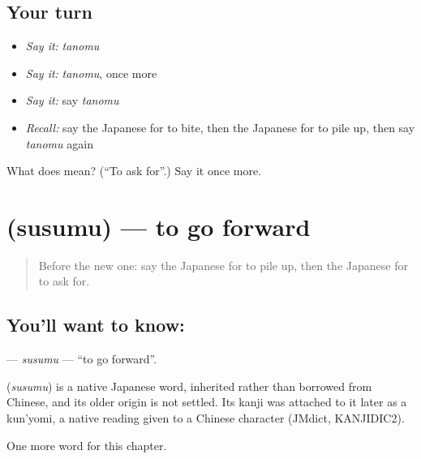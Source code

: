 \subsection*{Your turn}
\begin{itemize}
\raggedright
  \item \emph{Say it:} \emph{tanomu}
  \item \emph{Say it:} \emph{tanomu}, once more
  \item \emph{Say it:} say \emph{tanomu}
  \item \emph{Recall:} say the Japanese for to bite, then the Japanese for to pile up, then say \emph{tanomu} again
\end{itemize}

\begin{tcolorbox}[breakable,colback=teal!4,colframe=teal!35!black,title={Before you move on}]
What does  mean? (\textquotedblleft{}To ask for\textquotedblright{}.) Say it once more.
\end{tcolorbox}
\section[\texorpdfstring{\ja{すすむ} (susumu)}{すすむ (susumu)}]{ (susumu) — to go forward}

\label{lesson:JA-C87-susumu}



\begin{quote}
Before the new one: say the Japanese for to pile up, then the Japanese for to ask for.
\end{quote}

\subsection*{You'll want to know: }
\textbf{} — \emph{susumu} — \textquotedblleft{}to go forward\textquotedblright{}.

\begin{cousinweb}
\textbf{} (\emph{susumu}) is a native Japanese word, inherited rather than borrowed from Chinese, and its older origin is not settled. Its kanji was attached to it later as a kun'yomi, a native reading given to a Chinese character (JMdict, KANJIDIC2).
\end{cousinweb}

\begin{grammarlens}[title={What you've built}]
One more word for this chapter.
\end{grammarlens}

